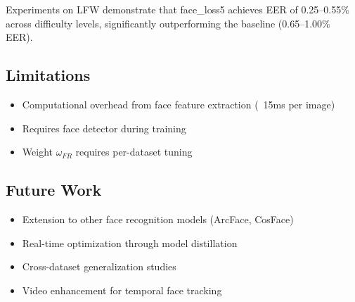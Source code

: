 \documentclass[12pt,a4paper]{article}
\begin{document}
Experiments on LFW demonstrate that face\_loss5 achieves EER of 0.25--0.55\% across difficulty levels, significantly outperforming the baseline (0.65--1.00\% EER).

\subsection{Limitations}

\begin{itemize}
    \item Computational overhead from face feature extraction (~15ms per image)
    \item Requires face detector during training
    \item Weight $\omega_{FR}$ requires per-dataset tuning
\end{itemize}

\subsection{Future Work}

\begin{itemize}
    \item Extension to other face recognition models (ArcFace, CosFace)
    \item Real-time optimization through model distillation
    \item Cross-dataset generalization studies
    \item Video enhancement for temporal face tracking
\end{itemize}



\end{document}
